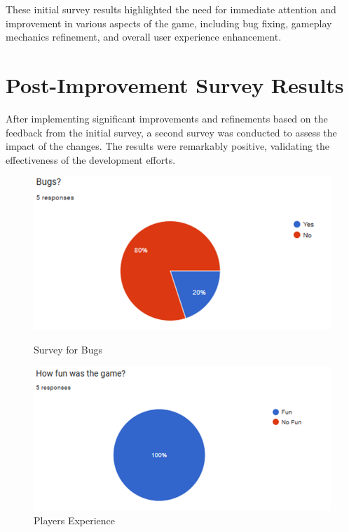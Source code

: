 \noindent These initial survey results highlighted the need for immediate attention and improvement in various aspects of the game, including bug fixing, gameplay mechanics refinement, and overall user experience enhancement.

\section{Post-Improvement Survey Results}
After implementing significant improvements and refinements based on the feedback from the initial survey, a second survey was conducted to assess the impact of the changes. The results were remarkably positive, validating the effectiveness of the development efforts.
\\

\begin{figure}[h]
    \centering
    \begin{minipage}{0.49\textwidth}
    \centering
    \includegraphics[width=1\textwidth]{figures/Bug2.png}
    \caption{Survey for Bugs}
    \label{fig:bug_survey1}
    \end{minipage}
    \hfill
    \begin{minipage}{0.49\textwidth}
    \centering
    \includegraphics[width=1\textwidth]{figures/Fun2.png}
    \caption{Players Experience}
    \label{fig:player_experience1}
    \end{minipage}
\end{figure}

